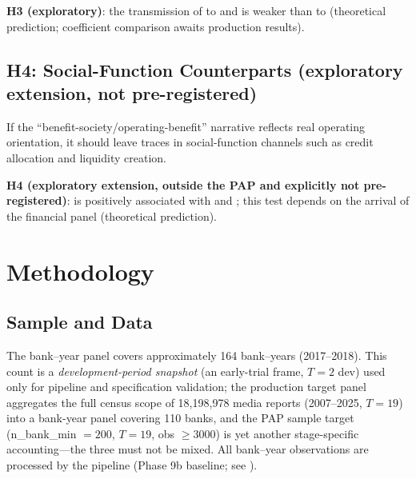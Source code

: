 \textbf{H3 (exploratory)}: the transmission of
 to  and
 is weaker than to
 (theoretical prediction; coefficient
comparison awaits production results).

\subsection{H4: Social-Function Counterparts (exploratory extension, not pre-registered)}
If the ``benefit-society/operating-benefit'' narrative reflects real
operating orientation, it should leave traces in social-function
channels such as credit allocation and liquidity creation.

\textbf{H4 (exploratory extension, outside the PAP and explicitly not
pre-registered)}:  is positively associated
with  and ;
this test depends on the arrival of the financial panel (theoretical
prediction).

\section{Methodology}\label{sec:method}
\subsection{Sample and Data}
The bank--year panel covers approximately 164 bank--years
(2017--2018). This count is a \emph{development-period snapshot}
(an early-trial frame, $T=2$ dev) used only for pipeline and specification validation; the
production target panel aggregates the full census scope of
18{,}198{,}978 media reports (2007--2025, $T=19$) into a bank-year
panel covering 110
banks, and the PAP sample target (n\_bank\_min $= 200$, $T=19$, obs
$\geq 3000$) is yet another stage-specific accounting---the three
must not be mixed.
All bank--year observations are processed by the
 pipeline (Phase 9b baseline; see
).

